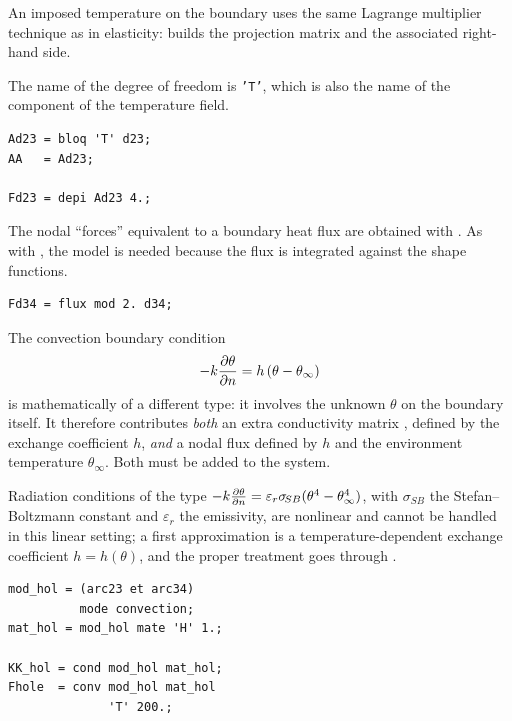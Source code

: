 \begin{castemcom}
An imposed temperature on the boundary uses the same Lagrange multiplier
technique as in elasticity:  builds the projection matrix and
 the associated right-hand side.

The name of the degree of freedom is \texttt{'T'}, which is also the name of
the component of the temperature field.
\end{castemcom}
\begin{castemlines}
\begin{verbatim}
Ad23 = bloq 'T' d23;
AA   = Ad23;

Fd23 = depi Ad23 4.;
\end{verbatim}
\end{castemlines}

\begin{castemcom}
The nodal ``forces'' equivalent to a boundary heat flux are obtained with
 . As with , the model is
needed because the flux is integrated against the shape functions.
\end{castemcom}
\begin{castemlines}
\begin{verbatim}
Fd34 = flux mod 2. d34;
\end{verbatim}
\end{castemlines}

\begin{castemcom}
The convection boundary condition
\[ -k\frac{\partial \theta}{\partial n}=h\,(\theta-\theta_{\infty}) \]
is mathematically of a different type: it involves the unknown $\theta$ on the
boundary itself. It therefore contributes \emph{both} an extra conductivity
matrix , defined by the exchange coefficient $h$, \emph{and} a
nodal flux  defined by $h$ and the environment temperature
$\theta_{\infty}$. Both must be added to the system.

Radiation conditions of the type
$-k\frac{\partial \theta}{\partial n}=\varepsilon_{r}\sigma_{\!SB}(\theta^{4}-\theta_{\infty}^{4})$,
with $\sigma_{\!SB}$ the Stefan--Boltzmann constant and $\varepsilon_{r}$ the
emissivity, are
nonlinear and cannot be handled in this linear setting; a first approximation
is a temperature-dependent exchange coefficient $h=h(\theta)$, and the proper
treatment goes through .
\end{castemcom}
\begin{castemlines}
\begin{verbatim}
mod_hol = (arc23 et arc34)
          mode convection;
mat_hol = mod_hol mate 'H' 1.;

KK_hol = cond mod_hol mat_hol;
Fhole  = conv mod_hol mat_hol
              'T' 200.;
\end{verbatim}
\end{castemlines}

